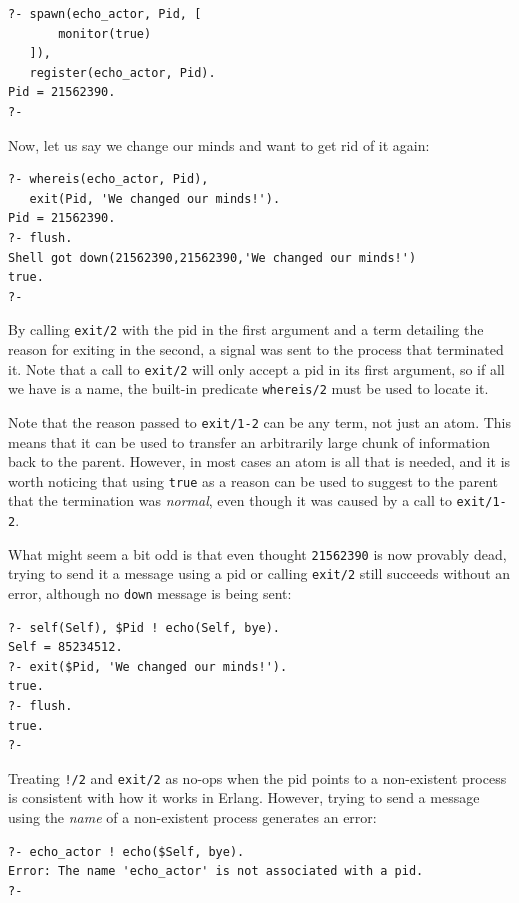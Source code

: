 \begin{verbatim}
?- spawn(echo_actor, Pid, [
       monitor(true)
   ]),
   register(echo_actor, Pid).
Pid = 21562390.
?-
\end{verbatim}

\noindent Now, let us say we change our minds and want to get rid of it again:

\begin{verbatim}   
?- whereis(echo_actor, Pid),
   exit(Pid, 'We changed our minds!').
Pid = 21562390.
?- flush.
Shell got down(21562390,21562390,'We changed our minds!')
true.
?-
\end{verbatim}

\noindent By calling \texttt{exit/2} with the pid in the first argument and a term detailing the reason for exiting in the second, a signal was sent to the process that terminated it. Note that a call to \texttt{exit/2} will only accept a pid in its first argument, so if all we have is a name, the built-in predicate \texttt{whereis/2} must be used to locate it.

Note that the reason passed to \texttt{exit/1-2} can be any term, not just an atom. This means that it can be used to transfer an arbitrarily large chunk of information back to the parent. However, in most cases an atom is all that is needed, and it is worth noticing that using \texttt{true} as a reason can be used to suggest to the parent that the termination was \textit{normal}, even though it was caused by a call to \texttt{exit/1-2}.

What might seem a bit odd is that even thought \texttt{21562390} is now provably dead, trying to send it a message using a pid or calling \texttt{exit/2} still succeeds without an error, although no \texttt{down} message is being sent:

\begin{verbatim}
?- self(Self), $Pid ! echo(Self, bye).
Self = 85234512.
?- exit($Pid, 'We changed our minds!').
true.
?- flush.
true.
?-
\end{verbatim}

\noindent Treating \texttt{!/2} and \texttt{exit/2} as no-ops when the pid points to a non-existent process is consistent with how it works in Erlang. However, trying to send a message using the \textit{name} of a non-existent process generates an error:

\begin{verbatim}
?- echo_actor ! echo($Self, bye).
Error: The name 'echo_actor' is not associated with a pid.
?-
\end{verbatim}


